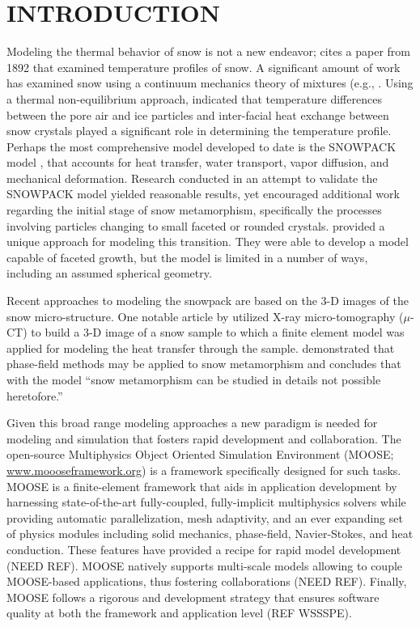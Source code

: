 \section{INTRODUCTION}
Modeling the thermal behavior of snow is not a new endeavor; \citet{lachapelle1960critique} cites a paper from 1892 that examined temperature profiles of snow. A significant amount of work has examined snow using a continuum mechanics theory of mixtures (e.g., \citet{adams1989constitutive, brown1999mixture}.  Using a thermal non-equilibrium approach, \citet{bartelt2004} indicated that temperature differences between the pore air and ice particles and inter-facial heat exchange between snow crystals played a significant role in determining the temperature profile. Perhaps the most comprehensive model developed to date is the SNOWPACK model \citep{bartelt2002physical, lehning2002physical, lehning2002physicalb}, that accounts for heat transfer, water transport, vapor diffusion, and mechanical deformation.  Research conducted in an attempt to validate the SNOWPACK model yielded reasonable results, yet \citet{fierz2001assessment} encouraged additional work regarding the initial stage of snow metamorphism, specifically the processes involving particles changing to small faceted or rounded crystals. \citet{miller2009microstructural} provided a unique approach for modeling this transition. They were able to develop a model capable of faceted growth, but the model is limited in a number of ways, including an assumed spherical geometry.

Recent approaches to modeling the snowpack are based on the 3-D images of the snow micro-structure.  One notable article by \citet{kaempfer2005microstructural} utilized X-ray micro-tomography ($\mu$-CT) to build a 3-D image of a snow sample to which a finite element model was applied for modeling the heat transfer through the sample. \citet{kaempfer2009phase} demonstrated that phase-field methods may be applied to snow metamorphism and concludes that with the model ``snow metamorphism can be studied in details not possible heretofore.''

Given this broad range modeling approaches a new paradigm is needed for modeling and simulation that fosters rapid development and collaboration. The open-source Multiphysics Object Oriented Simulation Environment (MOOSE; \url{www.moooseframework.org}) is a framework specifically designed for such tasks. MOOSE is a finite-element framework that aids in application development by harnessing state-of-the-art fully-coupled, fully-implicit multiphysics solvers while providing automatic parallelization, mesh adaptivity, and an ever expanding set of physics modules including solid mechanics, phase-field, Navier-Stokes, and heat conduction. These features have provided a recipe for rapid model development (NEED REF). MOOSE natively supports multi-scale models allowing to couple MOOSE-based applications, thus fostering collaborations (NEED REF). Finally, MOOSE follows a rigorous and development strategy that ensures software quality at both the framework and application level (REF WSSSPE).

